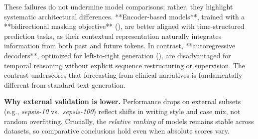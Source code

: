 These failures do not undermine model comparisons; rather, they highlight systematic architectural differences. **Encoder-based models**, trained with a **bidirectional masking objective** (\cite{devlin2019bert}), are better aligned with time-structured prediction tasks, as their contextual representation naturally integrates information from both past and future tokens.
In contrast, **autoregressive decoders**, optimized for left-to-right generation (\cite{brown2020language}), are disadvantaged for temporal reasoning without explicit sequence restructuring or supervision.
The contrast underscores that forecasting from clinical narratives is fundamentally different from standard text generation.
 
 \textbf{Why external validation is lower.} Performance drops on external subsets (e.g., \textit{sepsis-10} vs.\ \textit{sepsis-100}) reflect shifts in writing style and case mix, not random overfitting. Crucially, the \emph{relative ranking} of models remains stable across datasets, so comparative conclusions hold even when absolute scores vary.



